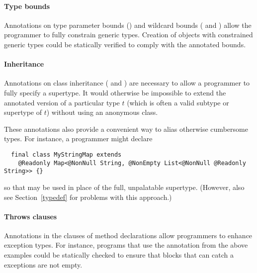 \documentclass[10pt]{article}
\begin{document}

\paragraph{Type bounds}
Annotations on type parameter bounds ()
and wildcard bounds ( and )
allow the programmer to fully constrain generic types.  Creation of
objects with constrained generic types could be statically verified to
comply with the annotated bounds.

\paragraph{Inheritance}
Annotations on class inheritance ( and
) are necessary to allow a programmer to fully
specify a supertype. It would otherwise be impossible to extend the
annotated version of a particular type $t$ (which is often a valid
subtype or supertype of $t$) without using an anonymous class.

\noindent
\label{class-inheritance-annotations}
These annotations also provide a convenient way to alias otherwise
cumbersome types. For instance, a programmer might declare

\begin{Verbatim}
  final class MyStringMap extends
    @Readonly Map<@NonNull String, @NonEmpty List<@NonNull @Readonly String>> {}
\end{Verbatim}

\noindent
so that  may be used in place of the full,
unpalatable supertype.  (However, also see Section~\ref{typedef} for
problems with this approach.)

\paragraph{Throws clauses}
Annotations in the  clauses of method declarations allow
programmers to enhance exception types. For instance, programs that
use the  annotation from the above examples could be
statically checked to ensure that  blocks that can catch a
 exceptions are not empty.

\end{document}
